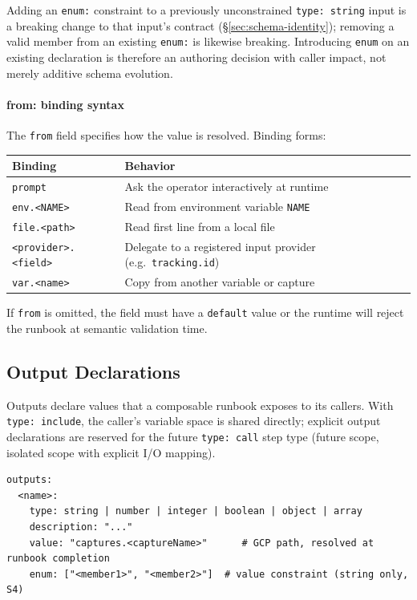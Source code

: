 Adding an \texttt{enum:} constraint to a previously unconstrained
\texttt{type: string} input is a breaking change to that input's contract
(\S\ref{sec:schema-identity}); removing a valid member from an existing
\texttt{enum:} is likewise breaking. Introducing \texttt{enum} on an
existing declaration is therefore an authoring decision with caller impact,
not merely additive schema evolution.

\paragraph{from: binding syntax}

The \texttt{from} field specifies how the value is resolved.  Binding
forms:

\begin{center}
\begin{tabular}{lp{7.5cm}}
\hline
\textbf{Binding} & \textbf{Behavior} \\
\hline
\texttt{prompt}          & Ask the operator interactively at runtime \\
\texttt{env.<NAME>}      & Read from environment variable \texttt{NAME} \\
\texttt{file.<path>}     & Read first line from a local file \\
\texttt{<provider>.<field>} & Delegate to a registered input provider (e.g.\ \texttt{tracking.id}) \\
\texttt{var.<name>}      & Copy from another variable or capture \\
\hline
\end{tabular}
\end{center}

If \texttt{from} is omitted, the field must have a \texttt{default} value or the
runtime will reject the runbook at semantic validation time.

\subsection{Output Declarations}
\label{subsec:outputs}

Outputs declare values that a composable runbook exposes to its callers.
With \texttt{type: include}, the caller's variable space is shared directly;
explicit output declarations are reserved for the future \texttt{type: call}
step type (future scope, isolated scope with explicit I/O mapping).

\begin{verbatim}
outputs:
  <name>:
    type: string | number | integer | boolean | object | array
    description: "..."
    value: "captures.<captureName>"      # GCP path, resolved at runbook completion
    enum: ["<member1>", "<member2>"]  # value constraint (string only, S4)
\end{verbatim}

